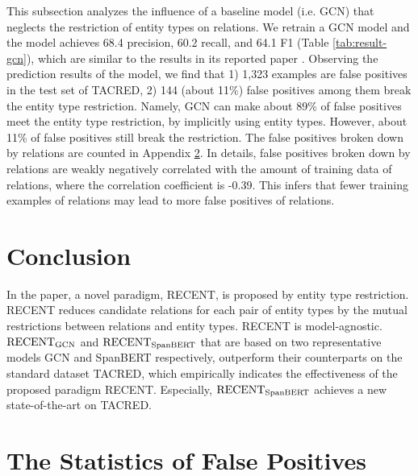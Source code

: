 \documentclass[11pt,a4paper]{article}
\begin{document}
This subsection analyzes the influence of a baseline model (i.e. GCN) that neglects the restriction of entity types on relations. 
We retrain a GCN model and the model achieves 68.4 precision, 60.2 recall, and 64.1 F1 (Table \ref{tab:result-gcn}), 
which are similar to the results in its reported paper \cite{zhang-etal-2018-graph}. 
Observing the prediction results of the model, we find that 1) 1,323 examples are false positives in the test set of TACRED, 
2) 144 (about 11\%) false positives among them break the entity type restriction. 
Namely, GCN can make about 89\% of false positives meet the entity type restriction, by implicitly using entity types. 
However, about 11\% of false positives still break the restriction. 
The false positives broken down by relations are counted in Appendix \ref{apx:stat-fp}.
In details, false positives  broken down by relations are weakly negatively correlated with the amount of training data of relations, where the correlation coefficient is -0.39. 
This infers that fewer training examples of relations may lead to more false positives of relations.


\section{Conclusion}

In the paper, a novel paradigm, RECENT, is proposed by entity type restriction.
RECENT reduces  candidate relations for each pair of entity types by 
the mutual restrictions between relations and entity types.
RECENT is model-agnostic. 
$\text{RECENT}_{\rm GCN}$ and $\text{RECENT}_{\rm SpanBERT}$ 
that are based on two representative models GCN and SpanBERT respectively,
outperform their counterparts on the standard dataset TACRED, 
which empirically indicates the effectiveness of the proposed paradigm RECENT.
Especially, $\text{RECENT}_{\rm SpanBERT}$ achieves a new state-of-the-art on TACRED.










\appendix 
\section{The Statistics of False Positives}
\label{apx:stat-fp} 
\end{document}

